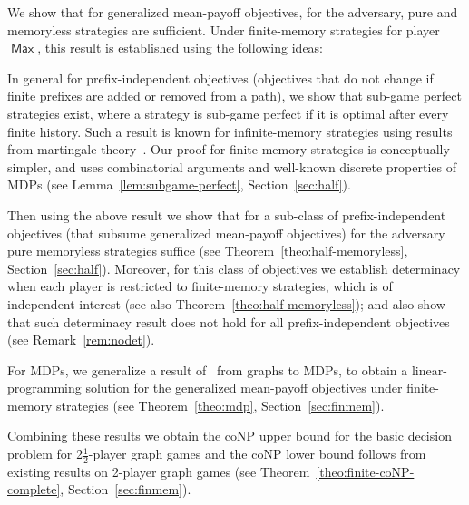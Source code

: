 \documentclass{article}
\newcommand{\half}{$\frac{\text{1}}{\text{2}}$}
\DeclareMathOperator{\ma}{\mathsf{Max}}
\begin{document}
\smallskip{}
We show that for generalized mean-payoff objectives, for the adversary, 
pure and memoryless strategies are sufficient. 
Under finite-memory strategies for player~$\ma$, this result is established
using the following ideas: 
\begin{compactitem}

\item In general for prefix-independent objectives (objectives that do not change
if finite prefixes are added or removed from a path), we show that sub-game perfect 
strategies exist, where a strategy is sub-game perfect if it is optimal after every
finite history.
Such a result is known for infinite-memory strategies using results
from martingale theory~\cite{GK14}. 
Our proof for finite-memory strategies is conceptually simpler, and 
uses combinatorial arguments and well-known discrete properties of MDPs 
(see Lemma~\ref{lem:subgame-perfect}, Section~\ref{sec:half}).

\item Then using the above result we show that for a sub-class of 
prefix-independent objectives (that subsume generalized mean-payoff objectives) 
for the adversary pure memoryless strategies suffice 
(see Theorem~\ref{theo:half-memoryless}, Section~\ref{sec:half}).
Moreover, for this class of objectives we establish determinacy when each
player is restricted to finite-memory strategies, which is of independent 
interest (see also Theorem~\ref{theo:half-memoryless}); and also show that such 
determinacy result does not hold for all prefix-independent objectives 
(see Remark~\ref{rem:nodet}).


\item For MDPs, we generalize a result of~\cite{KS88} from graphs to MDPs, 
to obtain a linear-programming solution for the generalized mean-payoff objectives 
under finite-memory strategies (see Theorem~\ref{theo:mdp}, Section~\ref{sec:finmem}). 
\end{compactitem}
Combining these results we obtain the coNP upper bound for the basic 
decision problem for 2\half-player graph games and the coNP 
lower bound follows from existing results on 2-player graph games 
(see Theorem~\ref{theo:finite-coNP-complete}, Section~\ref{sec:finmem}).
\end{document}
